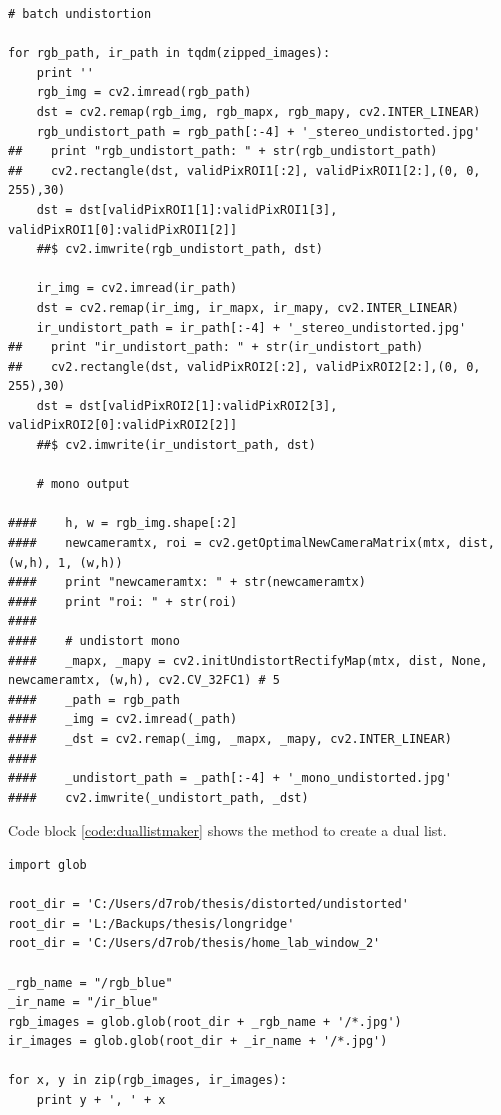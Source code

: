 \begin{appendices}
\begin{lstlisting}
# batch undistortion

for rgb_path, ir_path in tqdm(zipped_images):
    print ''
    rgb_img = cv2.imread(rgb_path)
    dst = cv2.remap(rgb_img, rgb_mapx, rgb_mapy, cv2.INTER_LINEAR)
    rgb_undistort_path = rgb_path[:-4] + '_stereo_undistorted.jpg'
##    print "rgb_undistort_path: " + str(rgb_undistort_path)
##    cv2.rectangle(dst, validPixROI1[:2], validPixROI1[2:],(0, 0, 255),30)
    dst = dst[validPixROI1[1]:validPixROI1[3], validPixROI1[0]:validPixROI1[2]]
    ##$ cv2.imwrite(rgb_undistort_path, dst)

    ir_img = cv2.imread(ir_path)
    dst = cv2.remap(ir_img, ir_mapx, ir_mapy, cv2.INTER_LINEAR)
    ir_undistort_path = ir_path[:-4] + '_stereo_undistorted.jpg'
##    print "ir_undistort_path: " + str(ir_undistort_path)
##    cv2.rectangle(dst, validPixROI2[:2], validPixROI2[2:],(0, 0, 255),30)
    dst = dst[validPixROI2[1]:validPixROI2[3], validPixROI2[0]:validPixROI2[2]]
    ##$ cv2.imwrite(ir_undistort_path, dst)

    # mono output

####    h, w = rgb_img.shape[:2]
####    newcameramtx, roi = cv2.getOptimalNewCameraMatrix(mtx, dist, (w,h), 1, (w,h))
####    print "newcameramtx: " + str(newcameramtx)
####    print "roi: " + str(roi)
####
####    # undistort mono
####    _mapx, _mapy = cv2.initUndistortRectifyMap(mtx, dist, None, newcameramtx, (w,h), cv2.CV_32FC1) # 5
####    _path = rgb_path
####    _img = cv2.imread(_path)
####    _dst = cv2.remap(_img, _mapx, _mapy, cv2.INTER_LINEAR)
####
####    _undistort_path = _path[:-4] + '_mono_undistorted.jpg'
####    cv2.imwrite(_undistort_path, _dst)

\end{lstlisting}

\newpage
Code block \ref{code:duallistmaker} shows the method to create a dual list.

\begin{lstlisting}
import glob

root_dir = 'C:/Users/d7rob/thesis/distorted/undistorted'
root_dir = 'L:/Backups/thesis/longridge'
root_dir = 'C:/Users/d7rob/thesis/home_lab_window_2'

_rgb_name = "/rgb_blue"
_ir_name = "/ir_blue"
rgb_images = glob.glob(root_dir + _rgb_name + '/*.jpg')
ir_images = glob.glob(root_dir + _ir_name + '/*.jpg')

for x, y in zip(rgb_images, ir_images):
    print y + ', ' + x


\end{lstlisting}
\end{appendices}
